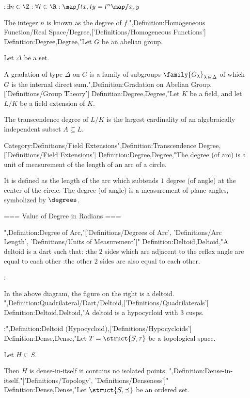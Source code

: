 :$\exists n \in \Z: \forall t \in \R: \map f {t x, t y} = t^n \map f {x, y}$


The integer $n$ is known as the degree of $f$.",Definition:Homogeneous Function/Real Space/Degree,['Definitions/Homogeneous Functions']
Definition:Degree,Degree,"Let $G$ be an abelian group.

Let $\Delta$ be a set.


A gradation of type $\Delta$ on $G$ is a family of subgroups $\family {G_\lambda}_{\lambda \mathop \in \Delta}$ of which $G$ is the internal direct sum.",Definition:Gradation on Abelian Group,['Definitions/Group Theory']
Definition:Degree,Degree,"Let $K$ be a field, and let $L/K$ be a field extension of $K$.

The transcendence degree of $L/K$ is the largest cardinality of an algebraically independent subset $A \subseteq L$.

Category:Definitions/Field Extensions",Definition:Transcendence Degree,['Definitions/Field Extensions']
Definition:Degree,Degree,"The degree (of arc) is a unit of measurement of the length of an arc of a circle.

It is defined as the length of the arc which subtends $1$ degree (of angle) at the center of the circle.
The degree (of angle) is a measurement of plane angles, symbolized by $\degrees$.









=== Value of Degree in Radians ===

",Definition:Degree of Arc,"['Definitions/Degrees of Arc', 'Definitions/Arc Length', 'Definitions/Units of Measurement']"
Definition:Deltoid,Deltoid,"A deltoid is a dart such that:
:the $2$ sides which are adjacent to the reflex angle are equal to each other
:the other $2$ sides are also equal to each other.


:

In the above diagram, the figure on the right is a deltoid.
",Definition:Quadrilateral/Dart/Deltoid,['Definitions/Quadrilaterals']
Definition:Deltoid,Deltoid,"A deltoid is a hypocycloid with $3$ cusps.


:",Definition:Deltoid (Hypocycloid),['Definitions/Hypocycloids']
Definition:Dense,Dense,"Let $T = \struct {S, \tau}$ be a topological space.

Let $H \subseteq S$.


Then $H$ is dense-in-itself  it contains no isolated points.
",Definition:Dense-in-itself,"['Definitions/Topology', 'Definitions/Denseness']"
Definition:Dense,Dense,"Let $\struct {S, \preceq}$ be an ordered set.


